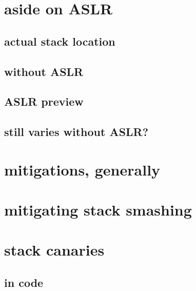 \graphicspath{{./figures/}}
\date{}

\begin{frame}
    \titlepage
\end{frame}



\usetikzlibrary{arrows.meta,calc,matrix,positioning}

\section{aside on ASLR}
\subsection{actual stack location}


\subsection{without ASLR}


\subsection{ASLR preview}


\subsection{still varies without ASLR?}


\section{mitigations, generally}


\section{mitigating stack smashing}


\section{stack canaries}
\subsection{in code}


